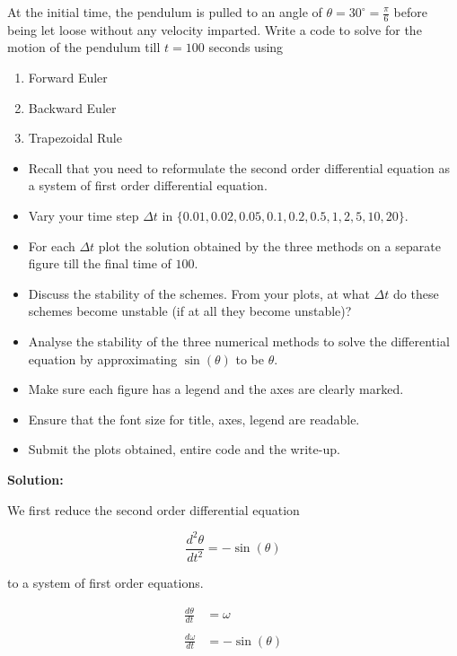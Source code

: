 \documentclass[a4paper,11pt]{report}
\begin{document}
\begin{enumerate}
    At the initial time, the pendulum is pulled to an angle of $\theta = 30^{\circ} =
    \displaystyle \frac{\pi}{6}$
    before being let loose without any velocity imparted. Write a code to solve for the
    motion of the pendulum till $t = 100$ seconds using

    \begin{enumerate}
    \item Forward Euler
    \item Backward Euler
    \item Trapezoidal Rule
    \end{enumerate}

    \begin{itemize}
    \item Recall that you need to reformulate the second order differential equation as a
    system of first order differential equation.
    \item Vary your time step $\Delta t$ in $\{0.01, 0.02, 0.05, 0.1, 0.2, 0.5, 1, 2, 5,
    10, 20\}$.
    \item For each $\Delta t$ plot the solution obtained by the three methods on a separate
    figure till the final time of $100$.
    \item Discuss the stability of the schemes. From your plots, at what $\Delta t$ do these
    schemes become unstable (if at all they become unstable)?
    \item Analyse the stability of the three numerical methods to solve the differential
    equation by approximating $\sin(\theta)$ to be $\theta$.
    \item Make sure each figure has a legend and the axes are clearly marked.
    \item Ensure that the font size for title, axes, legend are readable.
    \item Submit the plots obtained, entire code and the write-up.
    \end{itemize}


    \textbf{Solution:}

    We first reduce the second order differential equation

    \begin{equation*}
    \frac{d^{2} \theta}{dt^{2}} = - \sin(\theta)
    \end{equation*}

    to a system of first order equations.

    \begin{equation*}
    \begin{aligned}
    \frac{d \theta}{dt} &= \omega \\ \\
    \frac{d \omega}{dt} &= -\sin(\theta)
    \end{aligned}
    \end{equation*}


\end{enumerate}
\end{document}
